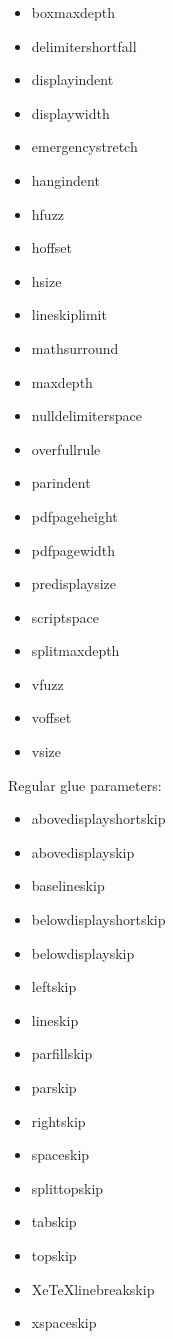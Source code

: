 \begin{itemize}
  \item boxmaxdepth
  \item delimitershortfall
  \item displayindent
  \item displaywidth
  \item emergencystretch
  \item hangindent
  \item hfuzz
  \item hoffset
  \item hsize
  \item lineskiplimit
  \item mathsurround
  \item maxdepth
  \item nulldelimiterspace
  \item overfullrule
  \item parindent
  \item pdfpageheight
  \item pdfpagewidth
  \item predisplaysize
  \item scriptspace
  \item splitmaxdepth
  \item vfuzz
  \item voffset
  \item vsize
\end{itemize}

Regular glue parameters:

\begin{itemize}
  \item abovedisplayshortskip
  \item abovedisplayskip
  \item baselineskip
  \item belowdisplayshortskip
  \item belowdisplayskip
  \item leftskip
  \item lineskip
  \item parfillskip
  \item parskip
  \item rightskip
  \item spaceskip
  \item splittopskip
  \item tabskip
  \item topskip
  \item XeTeXlinebreakskip
  \item xspaceskip
\end{itemize}


